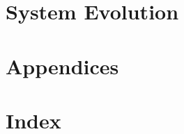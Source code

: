 \documentclass[letterpaper]{article}
\begin{document}
\section{System Evolution}
\lipsum

\section{Appendices}
\lipsum

\section{Index}
\lipsum
\end{document}

